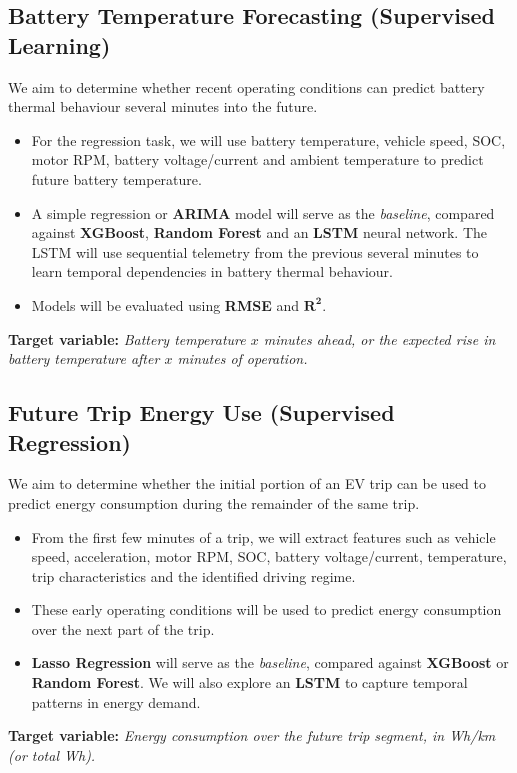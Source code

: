 \documentclass[11pt,letterpaper]{article}
\newcommand{\target}[1]{\par\nopagebreak[4]\textbf{Target variable:} \textit{#1}\par}
\begin{document}
\subsection{Battery Temperature Forecasting (Supervised Learning)}\label{sp:2}
We aim to determine whether recent operating conditions can predict battery thermal behaviour several minutes into the future.
\begin{itemize}
  \item For the regression task, we will use battery temperature, vehicle speed, SOC, motor RPM, battery voltage/current and ambient temperature to predict future battery temperature.
  \item A simple regression or \textbf{ARIMA} model will serve as the \textit{baseline}, compared against \textbf{XGBoost}, \textbf{Random Forest} and an \textbf{LSTM} neural network. The LSTM will use sequential telemetry from the previous several minutes to learn temporal dependencies in battery thermal behaviour.
  \item Models will be evaluated using \textbf{RMSE} and $\boldsymbol{R^2}$.
\end{itemize}
\target{Battery temperature $x$ minutes ahead, or the expected rise in battery temperature after $x$ minutes of operation.}

\subsection{Future Trip Energy Use (Supervised Regression)}\label{sp:3}
We aim to determine whether the initial portion of an EV trip can be used to predict energy consumption during the remainder of the same trip.
\begin{itemize}
  \item From the first few minutes of a trip, we will extract features such as vehicle speed, acceleration, motor RPM, SOC, battery voltage/current, temperature, trip characteristics and the identified driving regime.
  \item These early operating conditions will be used to predict energy consumption over the next part of the trip.
  \item \textbf{Lasso Regression} will serve as the \textit{baseline}, compared against \textbf{XGBoost} or \textbf{Random Forest}. We will also explore an \textbf{LSTM} to capture temporal patterns in energy demand.
\end{itemize}
\target{Energy consumption over the future trip segment, in Wh/km (or total Wh).}
\end{document}
